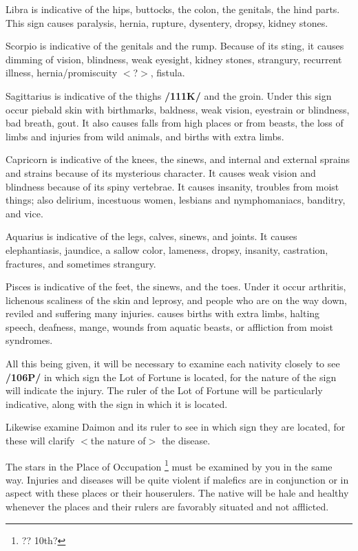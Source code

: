 Libra \mn{\Libra} is indicative of the hips, buttocks, the colon, the genitals, the hind parts. This sign causes
paralysis, hernia, rupture, dysentery, dropsy, kidney stones.

Scorpio \mn{\Scorpio} is indicative of the genitals and the rump. Because of its sting, it causes dimming of vision, blindness, weak eyesight, kidney stones, strangury, recurrent illness, hernia/promiscuity $<$?$>$, fistula.

Sagittarius \mn{\Sagittarius} is indicative of the thighs \textbf{/111K/} and the groin. Under this sign occur piebald skin with birthmarks, baldness, weak vision, eyestrain or blindness, bad breath, gout. It also causes falls from high
places or from beasts, the loss of limbs and injuries from wild animals, and births with extra limbs.

Capricorn \mn{\Capricorn} is indicative of the knees, the sinews, and internal and external sprains and strains because of its mysterious character. It causes weak vision and blindness because of its spiny vertebrae. It causes insanity, troubles from moist things; also delirium, incestuous women, lesbians and nymphomaniacs, banditry, and vice.

Aquarius \mn{\Aquarius} is indicative of the legs, calves, sinews, and joints. It causes elephantiasis, jaundice, a sallow color, lameness, dropsy, insanity, castration, fractures, and sometimes strangury.

Pisces \mn{\Pisces} is indicative of the feet, the sinews, and the toes. Under it occur arthritis, lichenous scaliness of the skin and leprosy, and people who are on the way down, reviled and suffering many injuries. \Pisces\xspace causes births with extra limbs, halting speech, deafness, mange, wounds from aquatic beasts, or affliction from moist syndromes.

All this being given, it will be necessary to examine each nativity closely to see \textbf{/106P/} in which sign the Lot of Fortune is located, for the nature of the sign will indicate the injury. The ruler of the Lot of Fortune will be particularly indicative, along with the sign in which it is located. 

Likewise examine Daimon and its ruler to see in which sign they are located, for these will clarify $<$the nature of$>$ the disease.

The stars in the Place of Occupation \footnote{?? 10th?} must be examined by you in the same way. Injuries and diseases will be quite violent if malefics are in conjunction or in aspect with these places or their houserulers. The native will be hale and healthy whenever the places and their rulers are favorably situated and not afflicted.

